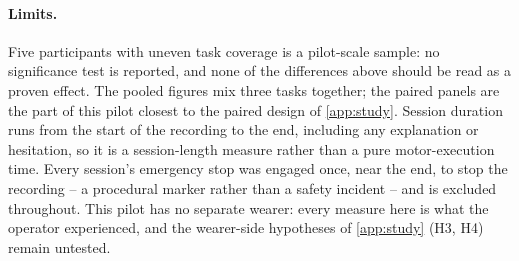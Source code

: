 \paragraph{Limits.} Five participants with uneven task coverage is a
pilot-scale sample: no significance test is reported, and none of the
differences above should be read as a proven effect. The pooled figures mix
three tasks together; the paired panels are the part of this pilot closest
to the paired design of \cref{app:study}. Session duration runs from the
start of the recording to the end, including any explanation or hesitation,
so it is a session-length measure rather than a pure motor-execution time.
Every session's emergency stop was engaged once, near the end, to stop the
recording -- a procedural marker rather than a safety incident -- and is
excluded throughout. This pilot has no separate wearer: every measure here
is what the operator experienced, and the wearer-side hypotheses of
\cref{app:study} (H3, H4) remain untested.
